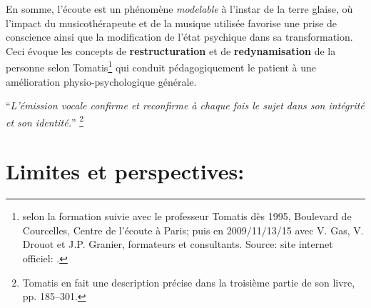 

        

  

En somme, l'écoute est un phénomène \textit{modelable} à l'instar de
la terre glaise, où l'impact du musicothérapeute et de la musique utilisée favorise une prise de
conscience ainsi que la modification
de  l'état psychique dans sa transformation.
Ceci évoque les concepts de \textbf{restructuration }et de
\textbf{redynamisation} de la personne selon Tomatis\footnote{selon la formation
   suivie avec le professeur Tomatis dès 1995, Boulevard de Courcelles, Centre de l'écoute à Paris; puis en 2009/11/13/15 avec V. Gas, V. Drouot et
J.P. Granier, formateurs et consultants. Source: site internet
officiel: \cite{tomatis.com}.}
qui conduit pédagogiquement le patient à une amélioration physio-psychologique
générale.

\enquote{\emph{L'émission vocale confirme et reconfirme à chaque
fois le sujet dans son intégrité et son identité.}}%
\autocite{tomatis:loreille} \footnote{Tomatis en fait une description précise dans la troisième partie de
son livre, pp. 185--301.}










  \section{Limites et perspectives: }

